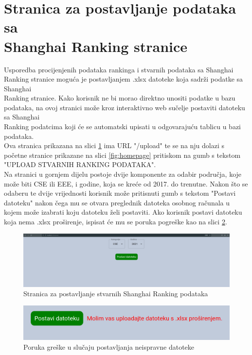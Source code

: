 \documentclass[times, utf8, zavrsni]{fer}
\begin{document}
\section{Stranica za postavljanje podataka sa \\Shanghai Ranking stranice}
Usporedba procijenjenih podataka rankinga i stvarnih podataka sa Shanghai Ranking stranice moguća je postavljanjem .xlsx datoteke koja sadrži 
podatke sa Shanghai \\Ranking stranice. Kako korisnik ne bi morao direktno unositi podatke u bazu podataka, na ovoj stranici može kroz 
interaktivno web sučelje postaviti datoteku sa Shanghai \\Ranking podatcima koji će se automatski upisati u odgovarajuću tablicu u bazi podataka.
\\Ova stranica prikazana na slici \ref{fig:upload} ima URL "/upload" te se na nju dolazi s početne stranice prikazane na slici \ref{fig:homepage} pritiskom na gumb s tekstom
"UPLOAD STVARNIH RANKING PODATAKA".
\\Na stranici u gornjem dijelu postoje dvije komponente za odabir područja, koje može biti CSE ili EEE, i godine, koja se kreće od 2017. do trenutne. Nakon što 
se odaberu te dvije vrijednosti korisnik može pritisnuti gumb s tekstom "Postavi datoteku" nakon čega mu se otvara preglednik datoteka osobnog računala
u kojem može izabrati koju datoteku želi postaviti. Ako korisnik postavi datoteku koja nema .xlsx proširenje, ispisat će mu se poruka pogreške kao na 
slici \ref{fig:error}.
\begin{figure}[htb]
    \hspace*{-2cm}  
       \includegraphics[scale=0.2]{upload.png} 
       \caption{Stranica za postavljanje stvarnih Shanghai Ranking podataka}
       \label{fig:upload}
       \end{figure} 
 \begin{figure}[htb]
        \centering
           \includegraphics[scale=0.2]{error.png} 
           \caption{Poruka greške u slučaju postavljanja neispravne datoteke}
           \label{fig:error}
           \end{figure}        
\end{document}
